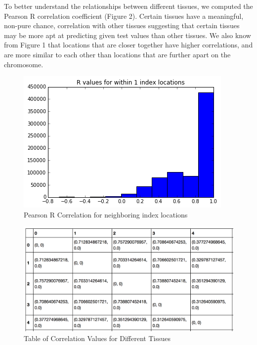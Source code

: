 \documentclass{article} %
\begin{document}
To better understand the relationships between different tissues, we computed the Pearson R correlation coefficient (Figure 2). Certain tissues have a meaningful, non-pure chance, correlation with other tissues suggesting that certain tissues may be more apt at predicting given test values than other tissues. We also know from Figure 1 that locations that are closer together have higher correlations, and are more similar to each other than locations that are further apart on the chromosome.

\begin{figure}[!ht]
\begin{center}
\caption{Pearson R Correlation for neighboring index locations}
\begin{minipage}[b]{0.40\linewidth}
	\includegraphics[scale=0.40]{CorrelationByLocation.png}
\end{minipage}
\quad
\end{center}
\end{figure}

\begin{figure}[!ht]
\begin{center}
\caption{Table of Correlation Values for Different Tissues}
\begin{minipage}[b]{0.40\linewidth}
	\includegraphics[scale=0.3]{table1.png}
\end{minipage}
\end{center}
\end{figure}
\end{document}
